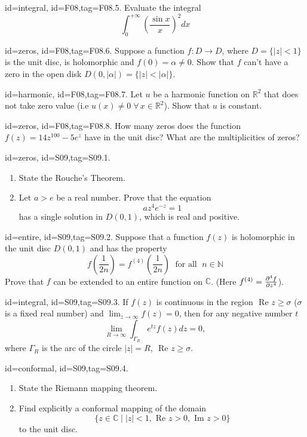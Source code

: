 \documentclass[12pt,letterpaper]{article}
\begin{document}
{\item[id=integral, id=F08,tag=F08.5.]
Evaluate the integral
\[
	\int_{0}^{+\infty} \left(\frac{\sin x}{x}\right)^2 dx
\]

\item[id=zeros, id=F08,tag=F08.6.]
Suppose a function $f : D \rightarrow D$, where $D = \{| z | < 1\}$ is the unit disc, is holomorphic and $f(0) = \alpha \ne 0$. Show that $f$ can't have a zero in the open disk $D(0,| \alpha |) = \{| z | < | \alpha |\}$.

\item[id=harmonic, id=F08,tag=F08.7.]
Let $u$ be a harmonic function on $\mathbb{R}^2$ that does not take zero value (i.e $u(x) \ne 0 \; \forall \, x \in \mathbb{R}^2$). Show that $u$ is constant.

\item[id=zeros, id=F08,tag=F08.8.]
How many zeros does the function $f(z) = 14z^{100} - 5 e^z$ have in the unit disc? What are the multiplicities of zeros?


\item[id=zeros, id=S09,tag=S09.1.]
\begin{enumerate}[label=(\alph*)]\onlyitems
\item State the Rouche's Theorem.
\item Let $a > e$ be a real number. Prove that the equation
\[
	a z^4 e^{-z} = 1
\]
has a single solution in $D(0,1)$, which is real and positive.
\end{enumerate}

\item[id=entire, id=S09,tag=S09.2.]
Suppose that a function $f(z)$ is holomorphic in the unit disc $D(0,1)$ and has the property
\[
	f\left(\frac{1}{2n}\right) = f^{(4)}\left(\frac{1}{2n}\right) \; \text{ for all } \; n \in \mathbb{N}
\]
Prove that $f$ can be extended to an entire function on $\mathbb{C}$. (Here $f^{(4)} = \pdv[4]{f}{z}$).

\item[id=integral, id=S09,tag=S09.3.]
If $f(z)$ is continuous in the region $\text{ Re } z \ge \sigma$ ($\sigma$ is a fixed real number) and $\lim_{z\rightarrow\infty} f(z) = 0$, then for any negative number $t$
\[
	\lim_{R\rightarrow\infty}\int_{\Gamma_R}e^{tz} f(z) dz = 0,
\]
where $\Gamma_R$ is the arc of the circle $| z | = R$, $\text{ Re } z \ge \sigma$.

\item[id=conformal, id=S09,tag=S09.4.]
\begin{enumerate}[label=(\alph*)]\onlyitems
\item State the Riemann mapping theorem.
\item Find explicitly a conformal mapping of the domain
\[
	\{z \in \mathbb{C} \mid | z | < 1, \text{ Re } z > 0, \text{ Im } z > 0 \}
\]
to the unit disc.
\end{enumerate}

}
\end{document}
